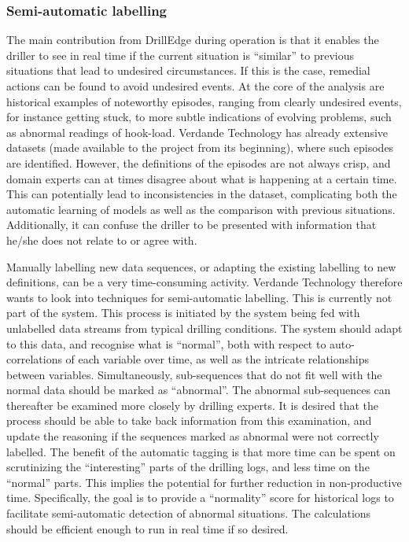 \subsubsection{Semi-automatic labelling}\label{SubSection:SemiAutomaticLabelling}

The main contribution from DrillEdge during operation is that it enables the driller to see in real time if the current situation is ``similar'' to previous situations that lead to undesired circumstances. If this is the case, remedial actions can be found to avoid undesired events. At the core of the analysis are historical examples of noteworthy episodes, ranging from clearly undesired events, for instance getting stuck, to more subtle indications of evolving problems, such as abnormal readings of hook-load. Verdande Technology has already extensive datasets (made available to the project from its beginning), where such episodes are identified. 
However, the definitions of the episodes are not always crisp, and domain experts can at times disagree about what is happening at a certain time. 
This can potentially lead to inconsistencies in the dataset, complicating both the automatic learning of models as well as the comparison with previous situations. 
Additionally, it can confuse the driller to be presented with information that he/she does not relate to or agree with.

Manually labelling new data sequences, or adapting the existing labelling to new definitions, can be a very time-consuming activity.  Verdande Technology therefore wants to look into techniques for semi-automatic labelling. This is currently not part of the system.
This process is initiated by the system being fed with unlabelled data streams from typical drilling conditions. The system should adapt to this data, and recognise what is ``normal'', both with respect to auto-correlations of each variable over time, as well as the intricate relationships between variables. Simultaneously, sub-sequences that do not fit well with the normal data should be marked as ``abnormal''.
The abnormal sub-sequences can thereafter be examined more closely by drilling experts. It is desired that the process should be able to take back information from this examination, and update the reasoning if the sequences marked as abnormal were not correctly labelled. The benefit of the automatic tagging is that more time can be spent on scrutinizing the ``interesting'' parts of the drilling logs, and less time on the ``normal'' parts. 
This implies the potential for further reduction in non-productive time. Specifically, the goal is to provide a ``normality'' score for historical logs to facilitate semi-automatic detection of abnormal situations. The calculations should be efficient enough to run in real time if so desired.


